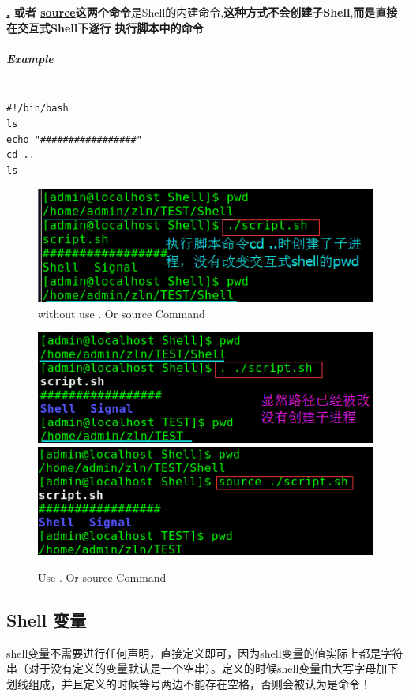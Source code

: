 \documentclass[UTF8,a4paper,12pt]{ctexbook}
\begin{document}
				 \textbf{\underline{.} 或者 \underline{source}这两个命令}是Shell的内建命令,\textbf{这种方式不会创建子Shell},\textbf{而是直接在交互式Shell下逐行 执行脚本中的命令}
				 
				 \subparagraph{Example}
					 \begin{lstlisting}[frame=L,xleftmargin=.06\textwidth]

#!/bin/bash
ls
echo "#################"
cd ..
ls
					 \end{lstlisting}
					 \begin{figure}[h]
					 	\centering
					 	\includegraphics[scale = 0.5]{figure/SourceExample.png}
					 	\caption{without use . Or source Command}
					 \end{figure}
					 \begin{figure}[h]
					 	\begin{center}
					 		\includegraphics[scale = 0.5]{figure/SourceExample1.png}
					 		\includegraphics[scale = 0.5]{figure/SourceExample2.png}
					 	\end{center}
					 	\caption{Use . Or source Command}
					 \end{figure}
		 \subsection{Shell 变量}
			 shell变量不需要进行任何声明，直接定义即可，因为shell变量的值实际上都是字符串（对于没有定义的变量默认是一个空串）。定义的时候shell变量由大写字母加下划线组成，并且定义的时候等号两边不能存在空格，否则会被认为是命令！
			 
\end{document}
